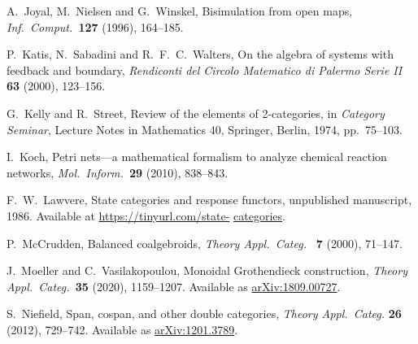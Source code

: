 \documentclass[reqno]{amsart}
\begin{document}
\begin{thebibliography}{100}
 A.\ Joyal, M.\ Nielsen and G.\ Winskel, Bisimulation from open maps, \textsl{Inf.\ Comput.\ }\textbf{127} (1996), 164--185.

 P.\ Katis, N.\ Sabadini and R.\ F.\ C.\ Walters, On the algebra of systems with feedback and boundary, \textsl{Rendiconti del Circolo Matematico di Palermo Serie II} \textbf{63} (2000), 123--156.

 G.\ Kelly and R.\ Street, Review of the elements of 2-categories, in \textsl{Category Seminar}, Lecture Notes in Mathematics 40, Springer, Berlin, 1974, 
pp.\ 75--103.

 I.\ Koch, Petri nets---a mathematical formalism to analyze chemical reaction
networks, \textsl{Mol.\ Inform.\  }\textbf{29} (2010), 838--843.

 F.\ W.\ Lawvere, State categories and response functors, unpublished manuscript, 1986.  Available at \href{https://tinyurl.com/state}{https://tinyurl.com/state-}  \href{https://tinyurl.com/state-categories}{categories}.





 P.\ McCrudden, Balanced coalgebroids, \textsl{Theory Appl.\ Categ.\ } \textbf{7} (2000), 71--147.

 J.\ Moeller and C.\ Vasilakopoulou, Monoidal Grothendieck construction, \textsl{Theory Appl.\ Categ.\ }\textbf{35} (2020), 1159--1207. Available as \href{https://arxiv.org/abs/1809.00727}{arXiv:1809.00727}.

 S.~Niefield, Span, cospan, and other double categories, \textsl{Theory Appl.\ Categ.} \textbf{26} (2012), 729--742. Available as \href{https://arxiv.org/abs/1201.3789}{arXiv:1201.3789}.


\end{thebibliography}
\end{document}
